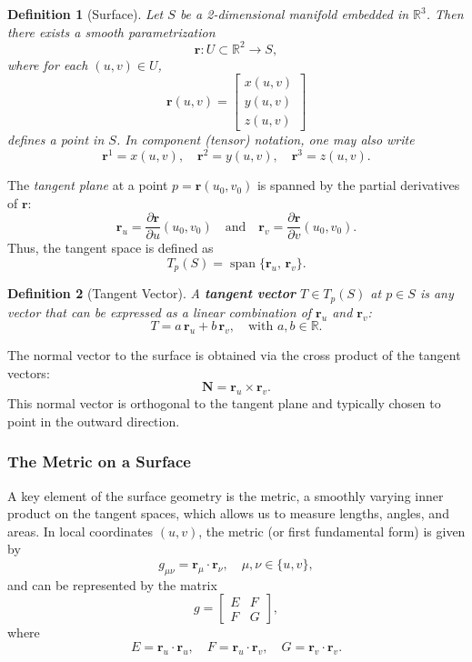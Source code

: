 \documentclass[12pt]{article}
\newcommand{\R}{\mathbb{R}}
\newtheorem{definition}{Definition}[section]
\begin{document}
\begin{definition}[Surface]
Let $S$ be a 2-dimensional manifold embedded in $\R^3$. Then there exists a smooth parametrization
\[
    \mathbf{r}: U \subset \R^2 \to S,
\]
where for each $(u,v) \in U$, 
\[
    \mathbf{r}(u,v) = \begin{bmatrix} x(u,v) \\ y(u,v) \\ z(u,v) \end{bmatrix}
\]
defines a point in $S$. In component (tensor) notation, one may also write
\[
    \mathbf{r}^1 = x(u,v), \quad \mathbf{r}^2 = y(u,v), \quad \mathbf{r}^3 = z(u,v).
\]
\end{definition}

The \emph{tangent plane} at a point $p=\mathbf{r}(u_0,v_0)$ is spanned by the partial derivatives of $\mathbf{r}$:
\[
    \mathbf{r}_u = \frac{\partial \mathbf{r}}{\partial u}(u_0,v_0) \quad \text{and} \quad \mathbf{r}_v = \frac{\partial \mathbf{r}}{\partial v}(u_0,v_0).
\]
Thus, the tangent space is defined as
\[
    T_{p}(S) = \operatorname{span}\{\mathbf{r}_u,\, \mathbf{r}_v\}.
\]

\begin{definition}[Tangent Vector]
A \textbf{tangent vector} $T \in T_{p}(S)$ at $p \in S$ is any vector that can be expressed as a linear combination of $\mathbf{r}_u$ and $\mathbf{r}_v$:
\[
    T = a\, \mathbf{r}_u + b\, \mathbf{r}_v, \quad \text{with } a,b\in \R.
\]
\end{definition}

The normal vector to the surface is obtained via the cross product of the tangent vectors:
\[
    \mathbf{N} = \mathbf{r}_u \times \mathbf{r}_v.
\]
This normal vector is orthogonal to the tangent plane and typically chosen to point in the outward direction.

\subsubsection{The Metric on a Surface}

A key element of the surface geometry is the metric, a smoothly varying inner product on the tangent spaces, which allows us to measure lengths, angles, and areas. In local coordinates $(u,v)$, the metric (or first fundamental form) is given by
\[
    g_{\mu\nu} = \mathbf{r}_\mu \cdot \mathbf{r}_\nu, \quad \mu,\nu \in \{u,v\},
\]
and can be represented by the matrix
\[
    g = \begin{bmatrix} E & F \\ F & G \end{bmatrix},
\]
where
\[
    E = \mathbf{r}_u \cdot \mathbf{r}_u,\quad F = \mathbf{r}_u \cdot \mathbf{r}_v,\quad G = \mathbf{r}_v \cdot \mathbf{r}_v.
\]
\end{document}
